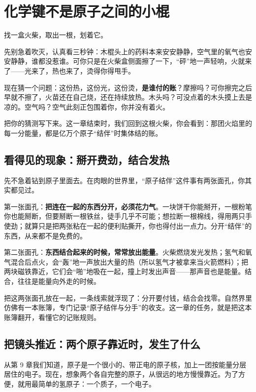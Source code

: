 \chapter{化学键不是原子之间的小棍}

\begin{kaichang}
找一盒火柴，取出一根，划着它。

先别急着吹灭，认真看三秒钟：木棍头上的药料本来安安静静，空气里的氧气也安安静静，谁都没惹谁。可你只是在火柴盒侧面擦了一下，“砰”地一声轻响，火就来了——光来了，热也来了，烫得你得甩手。

现在猜一个问题：这份热，这份光，这份烫，\textbf{是谁付的账}？摩擦吗？可你擦完之后早就不擦了，火苗还在自己烧，还在持续放热。木头吗？可没点着的木头摸上去是凉的。空气吗？空气此刻正包围着你，你并没有着火。

把你的猜测写下来。这一章结束时，我们回到这根火柴，你会看到：那团火焰里的每一分能量，都是亿万个原子“结伴”时集体结的账。
\end{kaichang}

\section{看得见的现象：掰开费劲，结合发热}

先不急着钻到原子里面去。在肉眼的世界里，“原子结伴”这件事有两张面孔，你其实都见过。

第一张面孔：\textbf{把连在一起的东西分开，必须花力气}。一块饼干你能掰开，一根粉笔你也能掰断，但要掰断一根铁丝，徒手几乎不可能；想拉断一根棉线，得用两只手使劲；就算只是把两张粘在一起的便利贴撕开，你也得付出一点力。分开“结伴”的东西，从来都不是免费的。

第二张面孔：\textbf{东西结合起来的时候，常常放出能量}。火柴燃烧发光发热；氢气和氧气混合后点火，会“轰”地一声放出大量的热（所以氢气才被拿来当火箭燃料）；把两块磁铁靠近，它们会“啪”地吸在一起，撞上时发出声音——那声音也是能量。结合，往往是能量向外走的时候。

把这两张面孔放在一起，一条线索就浮现了：分开要付钱，结合会找零。自然界里仿佛有一本账簿，专门记录“原子结伴与分手”的收支。这一章的任务，就是把这本账簿翻开，看懂它的记账规则。

\section{把镜头推近：两个原子靠近时，发生了什么}

从第 9 章我们知道，原子是一个很小的、带正电的原子核，加上一团按能量分层居住的电子。现在，想象两个各自完整的原子，从很远的地方慢慢靠近。为了方便，就用最简单的氢原子：一个质子，一个电子。

